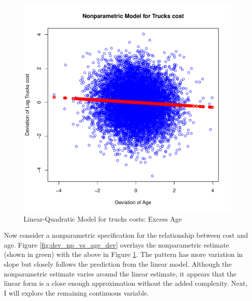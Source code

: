 \documentclass[11pt]{paper}
\begin{document}
\begin{figure}[h!]
  \centering
  \includegraphics[scale = 0.5, keepaspectratio=true]{../Figures/dev_vs_age_dev}
  \caption{Linear-Quadratic Model for trucks costs: Excess Age} \label{fig:dev_vs_age_dev}
\end{figure}

\clearpage
Now consider a nonparametric specification for 
the relationship between cost and age.
Figure \ref{fig:dev_np_vs_age_dev} 
overlays the nonparametric estimate (shown in green) with the above in 
Figure \ref{fig:dev_vs_age_dev}.
The pattern has more variation in slope but 
closely follows the prediction from the linear model. 
Although the nonparametric estimate varies around the linear estimate,
it appears that the linear form
is a close enough approximation without the added complexity.
Next, I will explore the remaining continuous variable.
\end{document}
